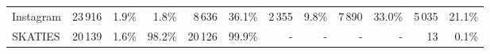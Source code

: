 \begin{tabular}{lrrrrrrrrrrr}
Instagram           &       23\,916 &        1.9\% &                 1.8\% &              8\,636 &             36.1\% &              2\,355 &              9.8\% &              7\,890 &             33.0\% &             5\,035 &            21.1\% \\
SKATIES             &       20\,139 &        1.6\% &                98.2\% &             20\,126 &             99.9\% &                   - &                  - &                   - &                  - &                 13 &             0.1\% \\
\bottomrule
\end{tabular}

